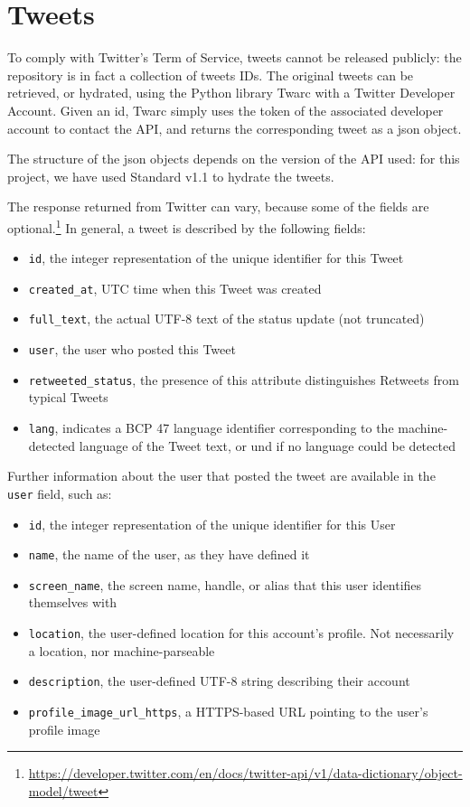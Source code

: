 \section{Tweets}
\label{sec:tweets}
To comply with Twitter's Term of Service, tweets cannot be released publicly: the repository is in fact a collection of tweets IDs. The original tweets can be retrieved, or hydrated, using the Python library Twarc with a Twitter Developer Account. Given an id, Twarc simply uses the token of the associated developer account to contact the API, and returns the corresponding tweet as a json object.

The structure of the json objects depends on the version of the API used: for this project, we have used Standard v1.1 to hydrate the tweets. 

The response returned from Twitter can vary, because some of the fields are optional.\footnote{\url{https://developer.twitter.com/en/docs/twitter-api/v1/data-dictionary/object-model/tweet}} In general, a tweet is described by the following fields:

\begin{itemize}
	\item \texttt{id}, the integer representation of the unique identifier for this Tweet
	\item \texttt{created\_at}, UTC time when this Tweet was created
	\item \texttt{full\_text}, the actual UTF-8 text of the status update (not truncated)
	\item \texttt{user}, the user who posted this Tweet
	\item \texttt{retweeted\_status}, the presence of this attribute distinguishes Retweets from typical Tweets
	\item \texttt{lang}, indicates a BCP 47 language identifier corresponding to the machine-detected language of the Tweet text, or und if no language could be detected
\end{itemize}

Further information about the user that posted the tweet are available in the \texttt{user} field, such as:

\begin{itemize}
	\item \texttt{id}, the integer representation of the unique identifier for this User
	\item \texttt{name}, the name of the user, as they have defined it
	\item \texttt{screen\_name}, the screen name, handle, or alias that this user identifies themselves with
	\item \texttt{location}, the user-defined location for this account's profile. Not necessarily a location, nor machine-parseable
	\item \texttt{description}, the user-defined UTF-8 string describing their account
	\item \texttt{profile\_image\_url\_https}, a HTTPS-based URL pointing to the user's profile image
\end{itemize}

